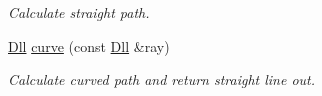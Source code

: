 \begin{DoxyCompactItemize}
\begin{DoxyCompactList}\small\item\em Calculate straight path. \end{DoxyCompactList}\item 
\hypertarget{structvsr_1_1_lens_a56456e6bcdd54ecda269a419644d48e0}{\hyperlink{namespacevsr_a6c6892b7aec25cfb16492501e2e35b11}{Dll} \hyperlink{structvsr_1_1_lens_a56456e6bcdd54ecda269a419644d48e0}{curve} (const \hyperlink{namespacevsr_a6c6892b7aec25cfb16492501e2e35b11}{Dll} \&ray)}\label{structvsr_1_1_lens_a56456e6bcdd54ecda269a419644d48e0}

\begin{DoxyCompactList}\small\item\em Calculate curved path and return straight line out. \end{DoxyCompactList}\end{DoxyCompactItemize}
